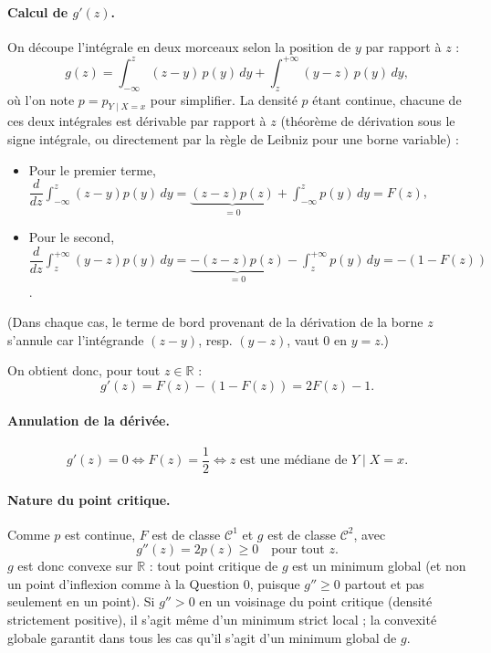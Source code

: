 \documentclass[11pt]{article}
\theoremstyle{remark}
\newcommand{\R}{\mathbb{R}}
\begin{document}
\paragraph{Calcul de $g'(z)$.}
On découpe l'intégrale en deux morceaux selon la position de $y$ par rapport à $z$ :
\[
  g(z) = \int_{-\infty}^{z} (z-y)\,p(y)\,dy + \int_{z}^{+\infty} (y-z)\,p(y)\,dy,
\]
où l'on note $p = p_{Y\mid X=x}$ pour simplifier. La densité $p$ étant continue, chacune de ces deux intégrales est dérivable par rapport à $z$ (théorème de dérivation sous le signe intégrale, ou directement par la règle de Leibniz pour une borne variable) :

\begin{itemize}
  \item Pour le premier terme, $\dfrac{d}{dz}\displaystyle\int_{-\infty}^{z}(z-y)p(y)\,dy = \underbrace{(z-z)p(z)}_{=0} + \displaystyle\int_{-\infty}^z p(y)\,dy = F(z)$,
  \item Pour le second, $\dfrac{d}{dz}\displaystyle\int_{z}^{+\infty}(y-z)p(y)\,dy = \underbrace{-(z-z)p(z)}_{=0} - \displaystyle\int_z^{+\infty} p(y)\,dy = -(1-F(z))$.
\end{itemize}

(Dans chaque cas, le terme de bord provenant de la dérivation de la borne $z$ s'annule car l'intégrande $(z-y)$, resp. $(y-z)$, vaut $0$ en $y=z$.)

On obtient donc, pour tout $z \in \R$ :
\[
  \boxed{g'(z) = F(z) - (1-F(z)) = 2F(z) - 1}.
\]

\paragraph{Annulation de la dérivée.}
\[
  g'(z) = 0 \iff F(z) = \frac{1}{2} \iff z \text{ est une médiane de } Y \mid X=x.
\]

\paragraph{Nature du point critique.}
Comme $p$ est continue, $F$ est de classe $\mathcal{C}^1$ et $g$ est de classe $\mathcal{C}^2$, avec
\[
  g''(z) = 2 p(z) \geq 0 \quad \text{pour tout } z.
\]
$g$ est donc convexe sur $\R$ : tout point critique de $g$ est un minimum global (et non un point d'inflexion comme à la Question 0, puisque $g'' \geq 0$ partout et pas seulement en un point). Si $g'' > 0$ en un voisinage du point critique (densité strictement positive), il s'agit même d'un minimum strict local ; la convexité globale garantit dans tous les cas qu'il s'agit d'un minimum global de $g$.
\end{document}
